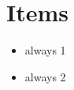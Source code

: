\hypertarget{items}{%
\section{Items}\label{items}}

\begin{itemize}
\tightlist
\item
  always 1
\item
  always 2
\end{itemize}
